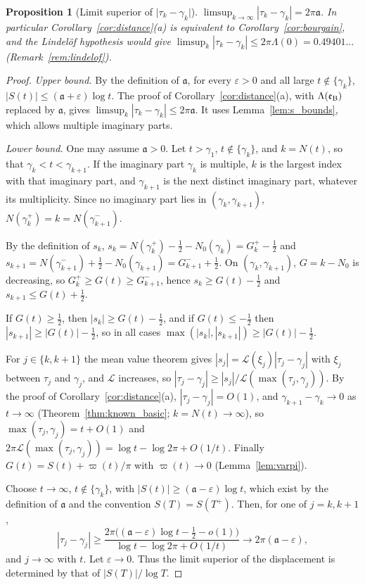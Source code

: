 \documentclass[11pt,a4paper]{article}
\makeatletter
\numberwithin{equation}{section}
\DeclareRobustCommand{\CGref}[1]{\ref{#1}}
\let\CG@origref\ref
\newcommand{\CG@gettip}[1]{\@ifundefined{CGTip@#1}{#1}{\csname CGTip@#1\endcsname}}
\DeclareRobustCommand{\CGref}[1]{\pdftooltip{\CG@origref{#1}}{\CG@gettip{#1}}}
\newtheorem{proposition}[theorem]{Proposition}
\theoremstyle{definition}
\theoremstyle{remark}
\newcommand{\Nz}{N_0} %
\newcommand{\lL}{\mathcal L}
\newcommand{\eB}{\mathfrak e_{\rm B}}
\makeatother
\begin{document}
\begin{proposition}[Limit superior of $\lvert\tau_k-\gamma_k\rvert$]\label{prop:distance_sharp}
$\limsup_{k\to\infty}|\tau_k-\gamma_k|=2\pi\mathfrak a$. In particular Corollary~\CGref{cor:distance}(a) is equivalent to Corollary~\CGref{cor:bourgain}, and the Lindel\"of hypothesis would give $\limsup_k|\tau_k-\gamma_k|\le2\pi\Lambda(0)=0.49401\ldots$ (Remark~\CGref{rem:lindelof}).
\end{proposition}

\begin{proof}
\emph{Upper bound.} By the definition of $\mathfrak a$, for every $\varepsilon>0$ and all large $t\notin\{\gamma_k\}$, $|S(t)|\le(\mathfrak a+\varepsilon)\log t$. The proof of Corollary~\CGref{cor:distance}(a), with $\Lambda(\eB)$ replaced by $\mathfrak a$, gives $\limsup_k|\tau_k-\gamma_k|\le2\pi\mathfrak a$. It uses Lemma~\CGref{lem:s_bounds}, which allows multiple imaginary parts.

\emph{Lower bound.} One may assume $\mathfrak a>0$. Let $t>\gamma_1$, $t\notin\{\gamma_k\}$, and $k=N(t)$, so that $\gamma_k<t<\gamma_{k+1}$. If the imaginary part $\gamma_k$ is multiple, $k$ is the largest index with that imaginary part, and $\gamma_{k+1}$ is the next distinct imaginary part, whatever its multiplicity. Since no imaginary part lies in $(\gamma_k,\gamma_{k+1})$, $N(\gamma_k^+)=k=N(\gamma_{k+1}^-)$.

By the definition of $s_k$, $s_k=N(\gamma_k^+)-\frac12-\Nz(\gamma_k)=G_k^+-\frac12$ and $s_{k+1}=N(\gamma_{k+1}^-)+\frac12-\Nz(\gamma_{k+1})=G_{k+1}^-+\frac12$. On $(\gamma_k,\gamma_{k+1})$, $G=k-\Nz$ is decreasing, so $G_k^+\ge G(t)\ge G_{k+1}^-$, hence $s_k\ge G(t)-\frac12$ and $s_{k+1}\le G(t)+\frac12$.

If $G(t)\ge\frac12$, then $|s_k|\ge G(t)-\frac12$, and if $G(t)\le-\frac12$ then $|s_{k+1}|\ge|G(t)|-\frac12$, so in all cases $\max(|s_k|,|s_{k+1}|)\ge|G(t)|-\frac12$.

For $j\in\{k,k+1\}$ the mean value theorem gives $|s_j|=\lL(\xi_j)|\tau_j-\gamma_j|$ with $\xi_j$ between $\tau_j$ and $\gamma_j$, and $\lL$ increases, so $|\tau_j-\gamma_j|\ge|s_j|/\lL(\max(\tau_j,\gamma_j))$. By the proof of Corollary~\CGref{cor:distance}(a), $|\tau_j-\gamma_j|=O(1)$, and $\gamma_{k+1}-\gamma_k\to0$ as $t\to\infty$ (Theorem~\CGref{thm:known_basic}; $k=N(t)\to\infty$), so $\max(\tau_j,\gamma_j)=t+O(1)$ and $2\pi\lL(\max(\tau_j,\gamma_j))=\log t-\log2\pi+O(1/t)$. Finally $G(t)=S(t)+\varpi(t)/\pi$ with $\varpi(t)\to0$ (Lemma~\CGref{lem:varpi}).

Choose $t\to\infty$, $t\notin\{\gamma_k\}$, with $|S(t)|\ge(\mathfrak a-\varepsilon)\log t$, which exist by the definition of $\mathfrak a$ and the convention $S(T)=S(T^+)$. Then, for one of $j=k,k+1$,
\begin{equation}
|\tau_j-\gamma_j|\ge\frac{2\pi\bigl((\mathfrak a-\varepsilon)\log t-\frac12-o(1)\bigr)}{\log t-\log2\pi+O(1/t)}\longrightarrow2\pi(\mathfrak a-\varepsilon),
\label{eq:disp_19}
\end{equation}
and $j\to\infty$ with $t$. Let $\varepsilon\to0$. Thus the limit superior of the displacement is determined by that of $|S(T)|/\log T$.
\end{proof}
\end{document}

